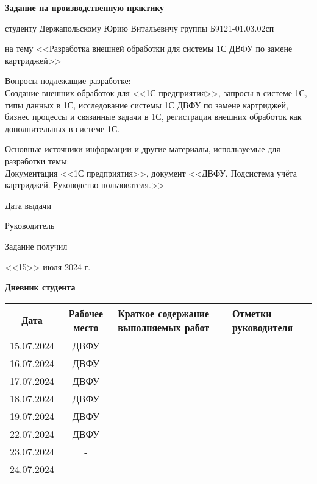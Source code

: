 \begin{center}
    \textbf{Задание на производственную практику}

    студенту Держапольскому Юрию Витальевичу группы Б9121-01.03.02сп
\end{center}
\noindent на тему <<Разработка внешней обработки для системы 1С ДВФУ по замене картриджей>>

\vspace{10pt}

Вопросы подлежащие разработке:\\
Создание внешних обработок для <<1С предприятия>>, запросы в системе 1С, типы данных в 1С, исследование системы 1С ДВФУ по замене картриджей, бизнес процессы и связанные задачи в 1С, регистрация внешних обработок как дополнительных в системе 1С.

\vspace{10pt}

Основные источники информации и другие материалы, используемые для разработки темы:\\
Документация <<1С предприятия>>, документ <<ДВФУ. Подсистема учёта картриджей. Руководство пользователя.>>

\begin{multicols}{2}

    Дата выдачи 

    Руководитель

    Задание получил

    \columnbreak

    \hspace*{-1cm} <<15>> июля 2024 г.

    \hspace*{-1cm} 

    \hspace*{-1cm} 

\end{multicols}

\pagebreak

\begin{center}
    \textbf{Дневник студента}

    \begin{tabular}[]{|c|c|m{6cm}|m{3cm}|}
        \hline
        Дата & Рабочее место & Краткое содержание выполняемых работ & Отметки руководителя\\
        \hline
        15.07.2024 & ДВФУ &  &  \\
        \hline
        16.07.2024 & ДВФУ &  &  \\
        \hline
        17.07.2024 & ДВФУ &  &  \\
        \hline
        18.07.2024 & ДВФУ &  &  \\
        \hline
        19.07.2024 & ДВФУ &  &  \\
        \hline
        22.07.2024 & ДВФУ &  &  \\
        \hline
        23.07.2024 & - &  &  \\
        \hline
        24.07.2024 & - &  &  \\
        \hline
    \end{tabular}
\end{center}

